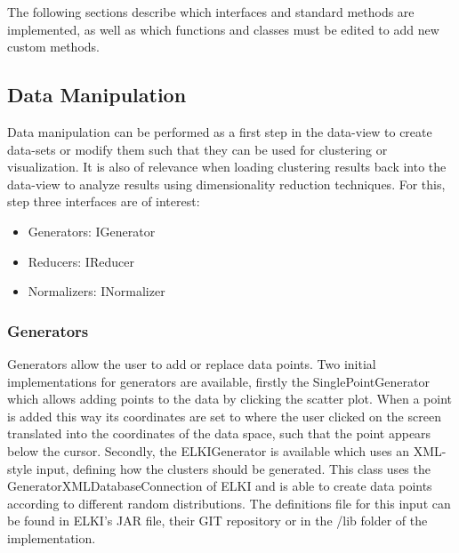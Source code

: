 \documentclass[
	a4paper,
	english,
	twoside,
	openright,               
	11pt                            
	]{report}
\begin{document}
The following sections describe which interfaces and standard methods are implemented, as well as which functions and classes must be edited to add new custom methods.

\subsection{Data Manipulation}

Data manipulation can be performed as a first step in the data-view to create data-sets or modify them such that they can be used for clustering or visualization. It is also of relevance when loading clustering results back into the data-view to analyze results using dimensionality reduction techniques. For this, step three interfaces are of interest:

\begin{itemize}
  \item Generators: IGenerator
  \item Reducers: IReducer
  \item Normalizers: INormalizer
\end{itemize}

\subsubsection{Generators}
Generators allow the user to add or replace data points. Two initial implementations for generators are available, firstly the SinglePointGenerator which allows adding points to the data by clicking the scatter plot. When a point is added this way its coordinates are set to where the user clicked on the screen translated into the coordinates of the data space, such that the point appears below the cursor. Secondly, the ELKIGenerator is available which uses an XML-style input, defining how the clusters should be generated. This class uses the GeneratorXMLDatabaseConnection of ELKI \cite{10.1007/978-3-540-69497-7_41} and is able to create data points according to different random distributions. The definitions file for this input can be found in ELKI's JAR file, their GIT repository \cite{elkixml} or in the /lib folder of the implementation.

\end{document}

